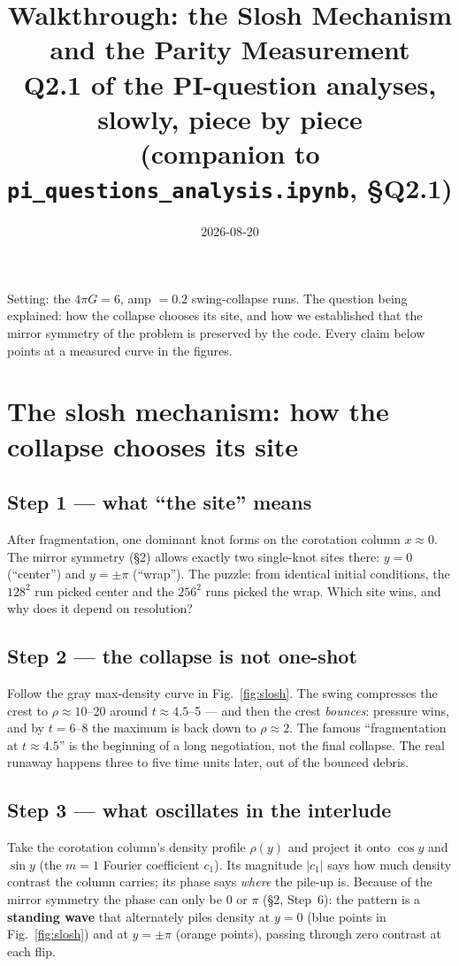 \documentclass[11pt]{article}
\title{Walkthrough: the Slosh Mechanism and the Parity Measurement\\
\large Q2.1 of the PI-question analyses, slowly, piece by piece\\
(companion to \texttt{pi\_questions\_analysis.ipynb}, \S Q2.1)}
\author{}
\date{2026-08-20}
\begin{document}
\maketitle

\noindent Setting: the $4\pi G = 6$, amp $= 0.2$ swing-collapse runs. The question
being explained: how the collapse chooses its site, and how we established that the
mirror symmetry of the problem is preserved by the code. Every claim below points at
a measured curve in the figures.

\section{The slosh mechanism: how the collapse chooses its site}

\subsection*{Step 1 --- what ``the site'' means}
After fragmentation, one dominant knot forms on the corotation column $x \approx 0$.
The mirror symmetry (\S2) allows exactly two single-knot sites there: $y = 0$
(``center'') and $y = \pm\pi$ (``wrap''). The puzzle: from identical initial
conditions, the $128^2$ run picked center and the $256^2$ runs picked the wrap.
Which site wins, and why does it depend on resolution?

\subsection*{Step 2 --- the collapse is not one-shot}
Follow the gray max-density curve in Fig.~\ref{fig:slosh}. The swing compresses the
crest to $\rho \approx 10$--20 around $t \approx 4.5$--5 --- and then the crest
\emph{bounces}: pressure wins, and by $t = 6$--8 the maximum is back down to
$\rho \approx 2$. The famous ``fragmentation at $t \approx 4.5$'' is the beginning
of a long negotiation, not the final collapse. The real runaway happens three to
five time units later, out of the bounced debris.

\subsection*{Step 3 --- what oscillates in the interlude}
Take the corotation column's density profile $\rho(y)$ and project it onto
$\cos y$ and $\sin y$ (the $m{=}1$ Fourier coefficient $c_1$). Its magnitude
$|c_1|$ says how much density contrast the column carries; its phase says
\emph{where} the pile-up is. Because of the mirror symmetry the phase can only be
$0$ or $\pi$ (\S2, Step~6): the pattern is a \textbf{standing wave} that alternately
piles density at $y = 0$ (blue points in Fig.~\ref{fig:slosh}) and at $y = \pm\pi$
(orange points), passing through zero contrast at each flip.
\end{document}
